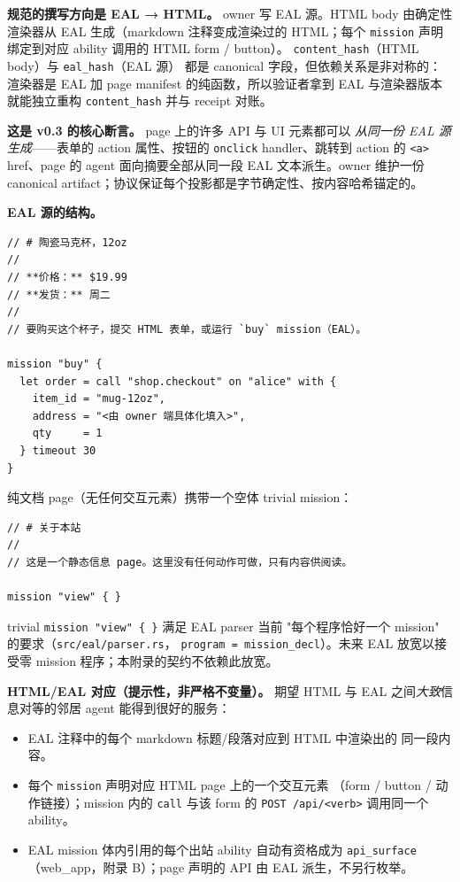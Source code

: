 \documentclass[11pt,a4paper]{article}
\theoremstyle{definition}
\begin{document}
\textbf{规范的撰写方向是 EAL → HTML。} owner 写 EAL 源。HTML body
由确定性渲染器从 EAL 生成（markdown 注释变成渲染过的 HTML；每个
\texttt{mission} 声明绑定到对应 ability 调用的 HTML form / button）。
\texttt{content\_hash}（HTML body）与 \texttt{eal\_hash}（EAL 源）
都是 canonical 字段，但依赖关系是非对称的：渲染器是 EAL 加 page
manifest 的纯函数，所以验证者拿到 EAL 与渲染器版本就能独立重构
\texttt{content\_hash} 并与 receipt 对账。

\textbf{这是 v0.3 的核心断言。} page 上的许多 API 与 UI 元素都可以
\emph{从同一份 EAL 源生成}——表单的 action 属性、按钮的
\texttt{onclick} handler、跳转到 action 的 \texttt{<a>} href、page
的 agent 面向摘要全部从同一段 EAL 文本派生。owner 维护一份 canonical
artifact；协议保证每个投影都是字节确定性、按内容哈希锚定的。

\textbf{EAL 源的结构。}

\begin{lstlisting}
// # 陶瓷马克杯，12oz
//
// **价格：** $19.99
// **发货：** 周二
//
// 要购买这个杯子，提交 HTML 表单，或运行 `buy` mission（EAL）。

mission "buy" {
  let order = call "shop.checkout" on "alice" with {
    item_id = "mug-12oz",
    address = "<由 owner 端具体化填入>",
    qty     = 1
  } timeout 30
}
\end{lstlisting}

纯文档 page（无任何交互元素）携带一个空体 trivial mission：

\begin{lstlisting}
// # 关于本站
//
// 这是一个静态信息 page。这里没有任何动作可做，只有内容供阅读。

mission "view" { }
\end{lstlisting}

trivial \texttt{mission "view" \{ \}} 满足 EAL parser 当前
"每个程序恰好一个 mission" 的要求（\texttt{src/eal/parser.rs}，
\texttt{program = mission\_decl}）。未来 EAL 放宽以接受零 mission
程序；本附录的契约不依赖此放宽。

\textbf{HTML/EAL 对应（提示性，非严格不变量）。} 期望 HTML 与 EAL
之间\emph{大致}信息对等的邻居 agent 能得到很好的服务：

\begin{itemize}[leftmargin=2em,itemsep=0.15em]
    \item EAL 注释中的每个 markdown 标题/段落对应到 HTML 中渲染出的
    同一段内容。
    \item 每个 \texttt{mission} 声明对应 HTML page 上的一个交互元素
    （form / button / 动作链接）；mission 内的 \texttt{call} 与该
    form 的 \texttt{POST /api/<verb>} 调用同一个 ability。
    \item EAL mission 体内引用的每个出站 ability 自动有资格成为
    \texttt{api\_surface}（web\_app，附录 B）；page 声明的 API 由
    EAL 派生，不另行枚举。
\end{itemize}
\end{document}
